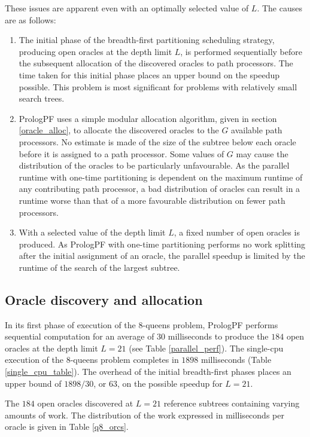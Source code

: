 These issues are apparent even with an optimally selected value of $L$.  The causes are
as follows:
\begin{enumerate}
\item{The initial phase of the breadth-first partitioning scheduling 
  strategy, producing open oracles at the depth limit $L$, is performed sequentially
  before the subsequent allocation of the discovered oracles to path processors.  The
  time taken for this initial phase places an upper bound on the speedup possible.
  This problem is most significant for problems with relatively small search trees.}
\item{PrologPF uses a simple modular allocation algorithm, given in section
  \ref{oracle_alloc}, to allocate the discovered oracles to the $G$ available path
  processors.  No estimate is made of the size of the subtree below each oracle before
  it is assigned to a path processor.  Some values of $G$ may cause the distribution
  of the oracles to be particularly unfavourable.
  As the parallel runtime with one-time partitioning 
  is dependent on the maximum runtime of any
  contributing path processor, a bad distribution of oracles can
  result in a runtime worse than
  that of a more favourable distribution on fewer path processors.}
\item{With a selected value of the depth limit $L$, a fixed number of open oracles
  is produced.  As PrologPF with one-time partitioning
  performs no work splitting after the initial assignment
  of an oracle, the parallel speedup is limited by the runtime of the search of the
  largest subtree.}
\end{enumerate}

\subsection{Oracle discovery and allocation}
\label{orc_discovery}

In its first phase of execution of the 8-queens problem, PrologPF
 performs sequential computation for an average of $30$ milliseconds to
 produce the $184$ open oracles at the depth limit $L=21$ (see Table
 \ref{parallel_perf}).
The single-cpu execution of the 8-queens problem completes in $1898$ milliseconds (Table
\ref{single_cpu_table}).  The overhead of the initial breadth-first phases places an
upper bound of $1898/30$, or $63$, on the possible speedup for $L=21$.

The $184$ open oracles discovered at $L=21$ reference subtrees containing varying amounts
of work.  The distribution of the work expressed in milliseconds per oracle is given
in Table \ref{q8_orcs}.

